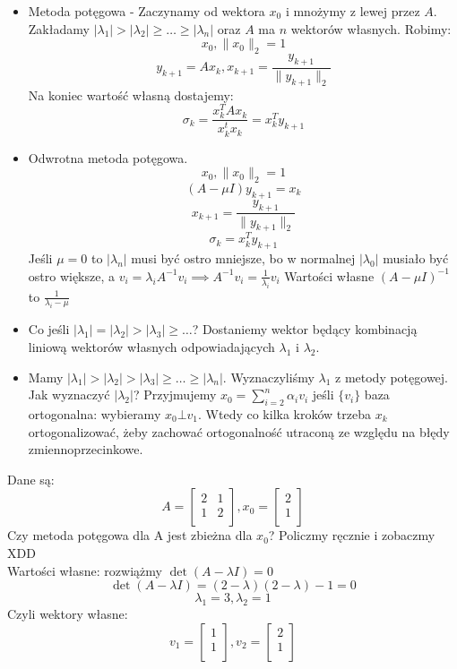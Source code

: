 \documentclass{article}
\begin{document}
\begin{itemize}
	\item Metoda potęgowa - Zaczynamy od wektora $x_0$ i mnożymy z lewej przez $ A $. Zakładamy $|\lambda_1|>|\lambda_2|\ge\ldots\ge|\lambda_n| $ oraz $ A $ ma $ n $ wektorów własnych. Robimy: $$ x_0, \|x_0\|_2=1 $$ 
	$$y_{k+1}=Ax_k, x_{k+1}=\frac{y_{k+1}}{\|y_{k+1}\|_2}$$
	Na koniec wartość własną dostajemy: 
	$$\sigma_k=\frac{x_k^TAx_k}{x_k^tx_k}=x^T_ky_{k+1} $$
	\item Odwrotna metoda potęgowa. 
	$$ x_0, \|x_0\|_2=1 $$ 
	$$(A-\mu I)y_{k+1}=x_k$$
	$$x_{k+1}=\frac{y_{k+1}}{\|y_{k+1}\|_2}$$
	$$\sigma_k=x^T_ky_{k+1} $$
	Jeśli $ \mu=0 $ to $ |\lambda_n| $ musi być ostro mniejsze, bo w normalnej $ |\lambda_0| $ musiało być ostro większe, a $ v_i=\lambda_iA^{-1}v_i\implies A^{-1}v_i=\frac1{\lambda_i}v_i$
	Wartości własne $ (A-\mu I)^{-1} $ to $ \frac{1}{\lambda_i-\mu} $
	\item Co jeśli $|\lambda_1|=|\lambda_2|>|\lambda_3|\ge \dots$? Dostaniemy wektor będący kombinacją liniową wektorów własnych odpowiadających $ \lambda_1 $ i $ \lambda_2 $.
	\item Mamy $|\lambda_1|>|\lambda_2|>|\lambda_3|\ge\ldots\ge|\lambda_n| $. Wyznaczyliśmy $ \lambda_1 $ z metody potęgowej. Jak wyznaczyć $|\lambda_2|$?
	Przyjmujemy $ x_0=\sum_{i=2}^{n}\alpha_iv_i $ jeśli $\{v_i\}  $ baza ortogonalna: wybieramy $ x_0\bot v_1 $. Wtedy co kilka  kroków trzeba $ x_k $ ortogonalizować, żeby zachować ortogonalność utraconą ze względu na błędy zmiennoprzecinkowe.
\end{itemize}
Dane są:
$$A=\begin{bmatrix}
2&1\\
1&2\\
\end{bmatrix}, x_0=\begin{bmatrix}
2\\
1\\
\end{bmatrix}$$ Czy metoda potęgowa dla A jest zbieżna dla $ x_0 $? Policzmy ręcznie i zobaczmy XDD\\
Wartości własne: rozwiążmy $ \det(A-\lambda I) =0$
$$\det(A-\lambda I) = (2-\lambda)(2-\lambda)-1=0$$
$$\lambda_1=3, \lambda_2=1$$
Czyli wektory własne:
$$v_1=\begin{bmatrix}
1\\
1\\
\end{bmatrix}, v_2=\begin{bmatrix}
2\\
1\\
\end{bmatrix}$$
\end{document}
